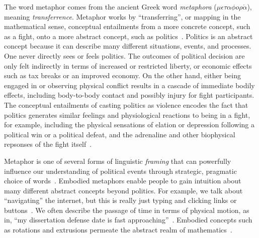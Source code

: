 The word metaphor
comes from the ancient Greek word \emph{metaphora} 
($\mu \epsilon \tau \alpha \phi o \rho \acute{\alpha}$), meaning
\emph{transferrence}.  Metaphor works by ``transferring'', or mapping in
the mathematical sense, conceptual entailments
from a more concrete concept, such as a fight, onto a more abstract concept,
such as politics~\cite{Regier1996,Kovecses2010a,Lakoff2014}. 
Politics is an abstract concept because it can describe many
different situations, events, and processes. One never directly sees or feels
politics. The outcomes of political decision are only felt indirectly in terms
of increased or restricted liberty, or economic effects such as tax breaks or
an improved economy.  On the other hand, either being engaged in or observing physical conflict
results in a cascade of immediate bodily effects, including body-to-body contact and
possibly injury for fight participants. The conceptual entailments of casting
politics as violence encodes the fact that politics generates similar 
feelings and physiological reactions to being in a fight, for example, 
including the physical sensations of elation or depression following a political win
or a political defeat, and the adrenaline and other biophysical repsonses
of the fight itself~\cite{Gallese2005,David2016}.

Metaphor is one of several forms of linguistic \emph{framing} that can 
powerfully influence our understanding of political
events through strategic, pragmatic choice of 
words~\cite{Fillmore1982,Chong2007,Lakoff2008,Charteris-Black2009,Fausey2011,Matlock2012,Sagi2013a,Cacciatore2016}.
Embodied metaphors enable people to gain intuition about many different
abstract concepts beyond politics. 
For example, we talk about ``navigating'' the internet, but this is 
really just typing and clicking links or buttons~\cite{Matlock2014}.
We often describe the passage of time in terms of physical motion, as in,
``my dissertation defense date is fast 
approaching''~\cite{Matlock2005,Nunez2012,Flusberg2017a}.
Embodied concepts such as rotations and extrusions permeate the abstract realm
of mathematics~\cite{Lakoff1997,Marghetis2013}. 

